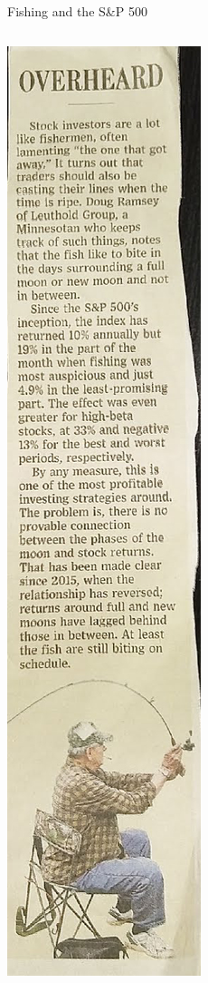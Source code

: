 \documentclass[aspectratio=169]{beamer}
\begin{document}
\begin{frame}{Fishing and the S\&P 500}

\begin{columns}[T]
\begin{column}{0.2\textwidth}
\includegraphics[width=.7\textwidth]{lectReg/fishing.jpg}
\end{column}
\begin{column}{0.7\textwidth}


\end{column}
\end{columns}
\end{frame}
\end{document}
